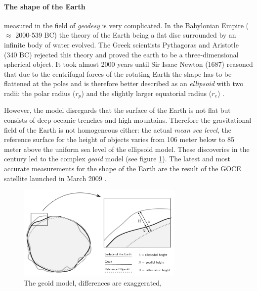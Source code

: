 \paragraph{The shape of the Earth} %
\label{par:the_shape_of_the_earth}

measured in the field of \emph{geodesy} is very complicated. In the Babylonian Empire ($\approx$ 2000-539 BC) the theory of the Earth being a flat disc surrounded by an infinite body of water
evolved. The Greek scientists Pythagoras and Aristotle (340 BC) rejected this theory and proved the earth to be a three-dimensional spherical object. It took almost 2000 years until Sir Isaac Newton (1687) reasoned that due to the centrifugal forces of the rotating Earth the shape has to be flattened at the poles and is therefore better described as an \emph{ellipsoid} with two radii: the polar radius ($r_p$) and the slightly larger equatorial radius ($r_e$)
\cite[pp. 69-77]{bolstad2008gis}.

However, the model disregards that the surface of the Earth is not flat but consists of deep oceanic trenches and high mountains. Therefore the gravitational field of the Earth is not homogeneous either: the actual \emph{mean sea level}, the reference surface for the height of objects varies from 106 meter below to 85 meter above the uniform sea level of the ellipsoid model. These discoveries in the  century led to the complex \emph{geoid} model (see figure \ref{fig:geoid}). The latest and most accurate measurements for the shape of the Earth are the result of the GOCE satellite launched in March 2009
\cite{geoid, geoidESRI}.

\begin{figure}[H]
  \centering
  \includegraphics[width=0.72\textwidth]{graphics/basics/geoid}
  \caption{The geoid model, differences are exaggerated, \cite[Fig. 3-6, p. 75]{bolstad2008gis}}
  \label{fig:geoid}
\end{figure}

